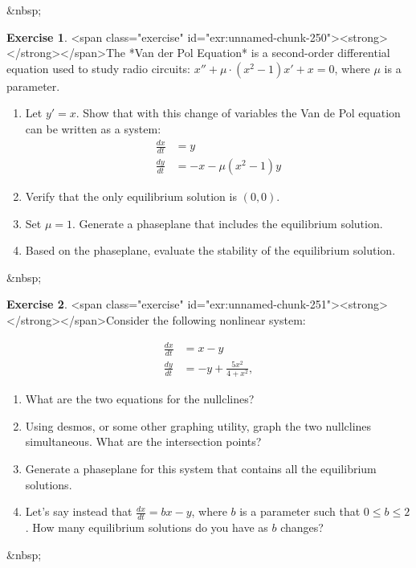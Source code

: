 \documentclass[
]{book}
\theoremstyle{definition}
\theoremstyle{definition}
\theoremstyle{definition}
\newtheorem{exercise}{Exercise}[chapter]
\theoremstyle{remark}
\begin{document}
&nbsp;

\begin{exercise}
<span class="exercise" id="exr:unnamed-chunk-250"><strong>\label{exr:unnamed-chunk-250} </strong></span>The *Van der Pol Equation* is a second-order differential equation used to study radio circuits: $x'' + \mu \cdot (x^{2}-1) x' + x = 0$, where $\mu$ is a parameter.

\begin{enumerate}[label=\alph*.]
\item Let $y'=x$. Show that with this change of variables the Van de Pol equation can be written as a system: 
\begin{equation}
\begin{split} 
\frac{dx}{dt} &= y \\ 
\frac{dy}{dt} &= -x-\mu (x^{2}-1)y
\end{split}
\end{equation}
\item Verify that the only equilibrium solution is $(0,0)$.
\item Set $\mu=1$. Generate a phaseplane that includes the equilibrium solution.
\item Based on the phaseplane, evaluate the stability of the equilibrium solution.
\end{enumerate}
\end{exercise}

&nbsp;
\begin{exercise}
<span class="exercise" id="exr:unnamed-chunk-251"><strong>\label{exr:unnamed-chunk-251} </strong></span>Consider the following nonlinear system:

\begin{equation}
\begin{split}
\frac{dx}{dt} &= x-y \\
\frac{dy}{dt} &=-y + \frac{5x^2}{4+x^{2}},
\end{split}
\end{equation}

\begin{enumerate}[label=\alph*.]
\item What are the two equations for the nullclines?
\item Using desmos, or some other graphing utility, graph the two nullclines simultaneous.  What are the intersection points?
\item Generate a phaseplane for this system that contains all the equilibrium solutions.
\item Let's say instead that $\displaystyle \frac{dx}{dt} = bx-y$, where $b$ is a parameter such that $0 \leq b \leq 2$. How many equilibrium solutions do you have as $b$ changes?
\end{enumerate}
\end{exercise}
&nbsp;
\end{document}
